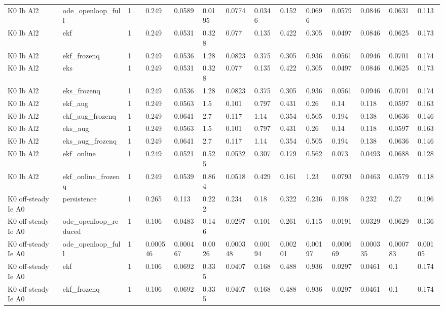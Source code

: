 \begin{table}[t]
\begin{tabular}{lllllllllllllll}
K0 Ib Al2 & ode\_openloop\_full & 1 &  & 0.249 & 0.0589 & 0.0195 & 0.0774 & 0.0346 & 0.152 & 0.0696 & 0.0579 & 0.0846 & 0.0631 & 0.113 \\
K0 Ib Al2 & ekf & 1 &  & 0.249 & 0.0531 & 0.328 & 0.077 & 0.135 & 0.422 & 0.305 & 0.0497 & 0.0846 & 0.0625 & 0.173 \\
K0 Ib Al2 & ekf\_frozenq & 1 &  & 0.249 & 0.0536 & 1.28 & 0.0823 & 0.375 & 0.305 & 0.936 & 0.0561 & 0.0946 & 0.0701 & 0.174 \\
K0 Ib Al2 & eks & 1 &  & 0.249 & 0.0531 & 0.328 & 0.077 & 0.135 & 0.422 & 0.305 & 0.0497 & 0.0846 & 0.0625 & 0.173 \\
K0 Ib Al2 & eks\_frozenq & 1 &  & 0.249 & 0.0536 & 1.28 & 0.0823 & 0.375 & 0.305 & 0.936 & 0.0561 & 0.0946 & 0.0701 & 0.174 \\
K0 Ib Al2 & ekf\_aug & 1 &  & 0.249 & 0.0563 & 1.5 & 0.101 & 0.797 & 0.431 & 0.26 & 0.14 & 0.118 & 0.0597 & 0.163 \\
K0 Ib Al2 & ekf\_aug\_frozenq & 1 &  & 0.249 & 0.0641 & 2.7 & 0.117 & 1.14 & 0.354 & 0.505 & 0.194 & 0.138 & 0.0636 & 0.146 \\
K0 Ib Al2 & eks\_aug & 1 &  & 0.249 & 0.0563 & 1.5 & 0.101 & 0.797 & 0.431 & 0.26 & 0.14 & 0.118 & 0.0597 & 0.163 \\
K0 Ib Al2 & eks\_aug\_frozenq & 1 &  & 0.249 & 0.0641 & 2.7 & 0.117 & 1.14 & 0.354 & 0.505 & 0.194 & 0.138 & 0.0636 & 0.146 \\
K0 Ib Al2 & ekf\_online & 1 &  & 0.249 & 0.0521 & 0.525 & 0.0532 & 0.307 & 0.179 & 0.562 & 0.073 & 0.0493 & 0.0688 & 0.128 \\
K0 Ib Al2 & ekf\_online\_frozenq & 1 &  & 0.249 & 0.0539 & 0.864 & 0.0518 & 0.429 & 0.161 & 1.23 & 0.0793 & 0.0463 & 0.0579 & 0.118 \\
K0 off-steady Ie A0 & persistence & 1 &  & 0.265 & 0.113 & 0.222 & 0.234 & 0.18 & 0.322 & 0.236 & 0.198 & 0.232 & 0.27 & 0.196 \\
K0 off-steady Ie A0 & ode\_openloop\_reduced & 1 &  & 0.106 & 0.0483 & 0.146 & 0.0297 & 0.101 & 0.261 & 0.115 & 0.0191 & 0.0329 & 0.0629 & 0.136 \\
K0 off-steady Ie A0 & ode\_openloop\_full & 1 &  & 0.000546 & 0.000467 & 0.0026 & 0.000348 & 0.00194 & 0.00201 & 0.00197 & 0.000669 & 0.000335 & 0.000783 & 0.00105 \\
K0 off-steady Ie A0 & ekf & 1 &  & 0.106 & 0.0692 & 0.335 & 0.0407 & 0.168 & 0.488 & 0.936 & 0.0297 & 0.0461 & 0.1 & 0.174 \\
K0 off-steady Ie A0 & ekf\_frozenq & 1 &  & 0.106 & 0.0692 & 0.335 & 0.0407 & 0.168 & 0.488 & 0.936 & 0.0297 & 0.0461 & 0.1 & 0.174 \\

\end{tabular}
\end{table}
